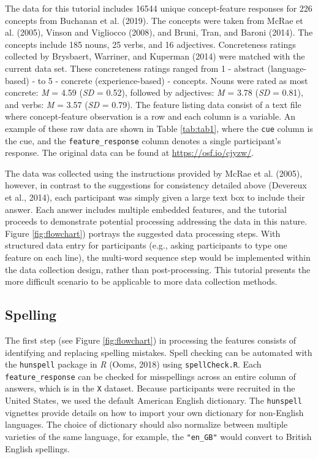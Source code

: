 \documentclass[man]{apa6}
\begin{document}
The data for this tutorial includes 16544 unique concept-feature responses for 226 concepts from Buchanan et al. (2019). The concepts were taken from McRae et al. (2005), Vinson and Vigliocco (2008), and Bruni, Tran, and Baroni (2014). The concepts include 185 nouns, 25 verbs, and 16 adjectives. Concreteness ratings collected by Brysbaert, Warriner, and Kuperman (2014) were matched with the current data set. These concreteness ratings ranged from 1 - abstract (language-based) - to 5 - concrete (experience-based) - concepts. Nouns were rated as most concrete: \emph{M} = 4.59 (\emph{SD} = 0.52), followed by adjectives: \emph{M} = 3.78 (\emph{SD} = 0.81), and verbs: \emph{M} = 3.57 (\emph{SD} = 0.79). The feature listing data consist of a text file where concept-feature observation is a row and each column is a variable. An example of these raw data are shown in Table \ref{tab:tab1}, where the \texttt{cue} column is the cue, and the \texttt{feature\_response} column denotes a single participant's response. The original data can be found at \url{https://osf.io/cjyzw/}.

The data was collected using the instructions provided by McRae et al. (2005), however, in contrast to the suggestions for consistency detailed above (Devereux et al., 2014), each participant was simply given a large text box to include their answer. Each answer includes multiple embedded features, and the tutorial proceeds to demonstrate potential processing addressing the data in this nature. Figure \ref{fig:flowchart}) portrays the suggested data processing steps. With structured data entry for participants (e.g., asking participants to type one feature on each line), the multi-word sequence step would be implemented within the data collection design, rather than post-processing. This tutorial presents the more difficult scenario to be applicable to more data collection methods.

\hypertarget{spelling}{%
\subsection{Spelling}\label{spelling}}

The first step (see Figure \ref{fig:flowchart}) in processing the features consists of identifying and replacing spelling mistakes. Spell checking can be automated with the \texttt{hunspell} package in \emph{R} (Ooms, 2018) using \texttt{spellCheck.R}. Each \texttt{feature\_response} can be checked for misspellings across an entire column of answers, which is in the \texttt{X} dataset. Because participants were recruited in the United States, we used the default American English dictionary. The \texttt{hunspell} vignettes provide details on how to import your own dictionary for non-English languages. The choice of dictionary should also normalize between multiple varieties of the same language, for example, the \texttt{"en\_GB"} would convert to British English spellings.
\end{document}
